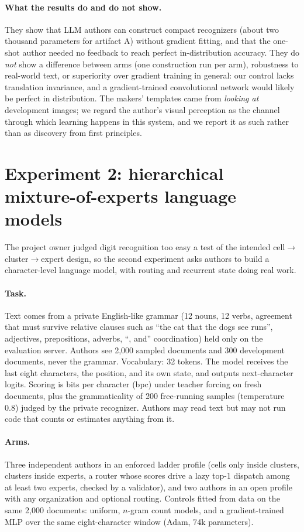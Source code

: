 \documentclass[11pt]{article}
\begin{document}
\paragraph{What the results do and do not show.}
They show that LLM authors can construct compact recognizers (about two thousand parameters
for artifact A) without gradient fitting, and that the one-shot author needed no
feedback to reach perfect in-distribution accuracy. They do \emph{not} show a difference
between arms (one construction run per arm), robustness to real-world text, or superiority
over gradient training in general: our control lacks translation invariance, and a
gradient-trained convolutional network would likely be perfect in distribution. The makers'
templates came from \emph{looking at} development images; we regard the author's visual
perception as the channel through which learning happens in this system, and we report it
as such rather than as discovery from first principles.

\section{Experiment 2: hierarchical mixture-of-experts language models}\label{sec:exp2}
The project owner judged digit recognition too easy a test of the intended
cell$\to$cluster$\to$expert design, so the second experiment asks authors to build a character-level
language model, with routing and recurrent state doing real work.

\paragraph{Task.} Text comes from a private English-like grammar (12 nouns, 12 verbs, agreement
that must survive relative clauses such as ``the cat that the dogs see runs'', adjectives,
prepositions, adverbs, ``, and'' coordination) held only on the evaluation server. Authors see
2{,}000 sampled documents and 300 development documents, never the grammar. Vocabulary: 32
tokens. The model receives the last eight characters, the position, and its own state, and outputs
next-character logits. Scoring is bits per character (bpc) under teacher forcing on fresh documents,
plus the grammaticality of 200 free-running samples (temperature 0.8) judged by the private
recognizer. Authors may read text but may not run code that counts or estimates anything from it.

\paragraph{Arms.} Three independent authors in an enforced ladder profile (cells only inside
clusters, clusters inside experts, a router whose scores drive a lazy top-1 dispatch among at least
two experts, checked by a validator), and two authors in an open profile with any organization and
optional routing. Controls fitted from data on the same 2{,}000 documents: uniform, $n$-gram
count models, and a gradient-trained MLP over the same eight-character window (Adam, 74k parameters).
\end{document}
